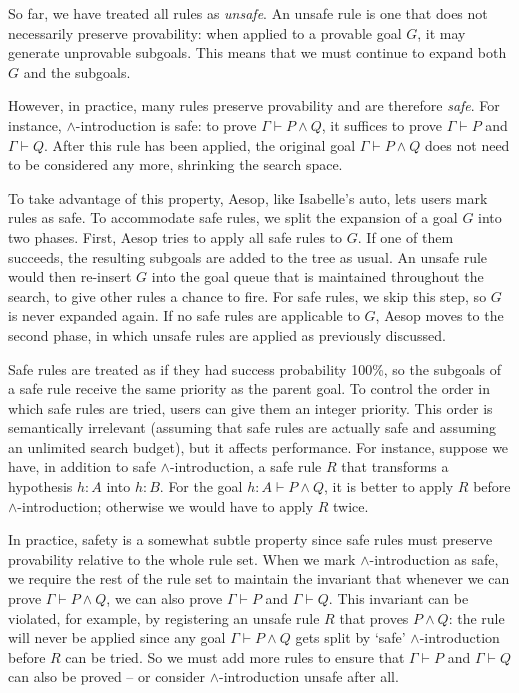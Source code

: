 So far, we have treated all rules as \emph{unsafe}.
An unsafe rule is one that does not necessarily preserve provability: when applied to a provable goal $G$, it may generate unprovable subgoals.
This means that we must continue to expand both $G$ and the subgoals.

However, in practice, many rules preserve provability and are therefore \emph{safe}.
For instance, $∧$-introduction is safe: to prove $Γ ⊢ P ∧ Q$, it suffices to prove $Γ ⊢ P$ and $Γ ⊢ Q$.
After this rule has been applied, the original goal $Γ ⊢ P ∧ Q$ does not need to be considered any more, shrinking the search space.

To take advantage of this property, Aesop, like Isabelle's auto, lets users mark rules as safe.
To accommodate safe rules, we split the expansion of a goal $G$ into two phases.
First, Aesop tries to apply all safe rules to $G$.
If one of them succeeds, the resulting subgoals are added to the tree as usual.
An unsafe rule would then re-insert $G$ into the goal queue that is maintained throughout the search, to give other rules a chance to fire.
For safe rules, we skip this step, so $G$ is never expanded again.
If no safe rules are applicable to $G$, Aesop moves to the second phase, in which unsafe rules are applied as previously discussed.

Safe rules are treated as if they had success probability 100\%, so the subgoals of a safe rule receive the same priority as the parent goal.
To control the order in which safe rules are tried, users can give them an integer priority.
This order is semantically irrelevant (assuming that safe rules are actually safe and assuming an unlimited search budget), but it affects performance.
For instance, suppose we have, in addition to safe $∧$-introduction, a safe rule $R$ that transforms a hypothesis $h : A$ into $h : B$.
For the goal $h : A ⊢ P ∧ Q$, it is better to apply $R$ before $∧$-introduction; otherwise we would have to apply $R$ twice.

In practice, safety is a somewhat subtle property since safe rules must preserve provability relative to the whole rule set.
When we mark $∧$-introduction as safe, we require the rest of the rule set to maintain the invariant that whenever we can prove $Γ ⊢ P ∧ Q$, we can also prove $Γ ⊢ P$ and $Γ ⊢ Q$.
This invariant can be violated, for example, by registering an unsafe rule $R$ that proves $P ∧ Q$: the rule will never be
applied since any goal $Γ ⊢ P ∧ Q$ gets split by \enquote*{safe} $∧$-introduction before $R$ can be tried.
So we must add more rules to ensure that $Γ ⊢ P$ and $Γ ⊢ Q$ can also be proved -- or consider $∧$-introduction unsafe after all.


